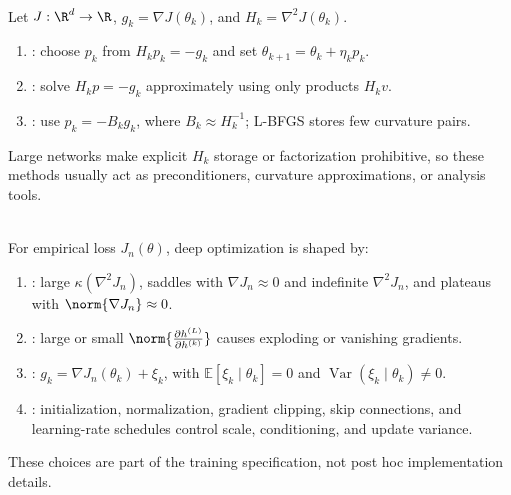 \begin{remark} \label{rem:sl-second-order-methods} \\
Let $J:\R^d\to\R$, $g_k=\nabla J(\theta_k)$, and $H_k=\nabla^2J(\theta_k)$.
\begin{enumerate}[label=(\roman*)]
\setlength{\itemsep}{0pt}
\item {}: choose $p_k$ from $H_kp_k=-g_k$ and set $\theta_{k+1}=\theta_k+\eta_kp_k$.
\item {}: solve $H_kp=-g_k$ approximately using only products $H_kv$.
\item {}: use $p_k=-B_kg_k$, where $B_k\approx H_k^{-1}$; L-BFGS stores few curvature pairs.
\end{enumerate}
Large networks make explicit $H_k$ storage or factorization prohibitive, so these methods usually act as preconditioners, curvature approximations, or analysis tools.
\end{remark}

\begin{remark} \label{rem:sl-deep-optimization-challenges} \\
For empirical loss $J_n(\theta)$, deep optimization is shaped by:
\begin{enumerate}[label=(\roman*)]
\setlength{\itemsep}{0pt}
\item {}: large $\kappa(\nabla^2J_n)$, saddles with $\nabla J_n\approx0$ and indefinite $\nabla^2J_n$, and plateaus with $\norm{\nabla J_n}\approx0$.
\item {}: large or small $\norm{\frac{\partial h^{(L)}}{\partial h^{(k)}}}$ causes exploding or vanishing gradients.
\item {}: $g_k=\nabla J_n(\theta_k)+\xi_k$, with $\mathbb E[\xi_k\mid\theta_k]=0$ and $\operatorname{Var}(\xi_k\mid\theta_k)\ne0$.
\item {}: initialization, normalization, gradient clipping, skip connections, and learning-rate schedules control scale, conditioning, and update variance.
\end{enumerate}
These choices are part of the training specification, not post hoc implementation details.
\end{remark}
